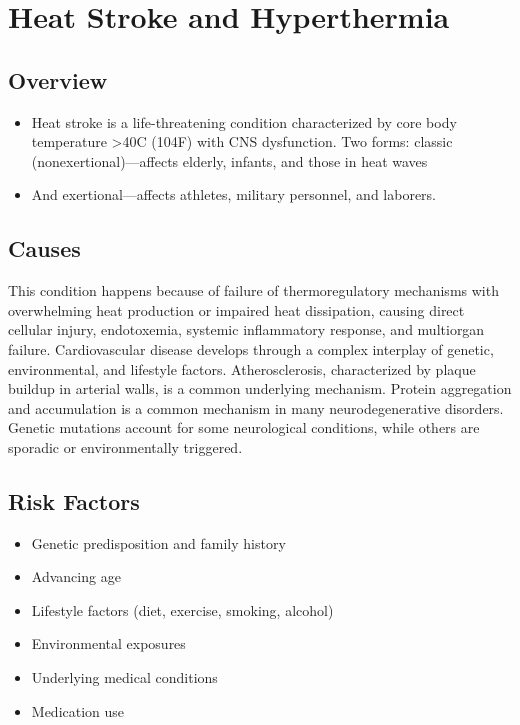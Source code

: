 \chapter{Heat Stroke and Hyperthermia}
\label{sec:Heat Stroke}

\section{Overview}


\begin{itemize}[noitemsep]
  \item Heat stroke is a life-threatening condition characterized by core body temperature >40\textdegree C (104\textdegree F) with CNS dysfunction. Two forms: classic (nonexertional)---affects elderly, infants, and those in heat waves
  \item And exertional---affects athletes, military personnel, and laborers.
\end{itemize}
\section{Causes}
This condition happens because of failure of thermoregulatory mechanisms with overwhelming heat production or impaired heat dissipation, causing direct cellular injury, endotoxemia, systemic inflammatory response, and multiorgan failure. Cardiovascular disease develops through a complex interplay of genetic, environmental, and lifestyle factors. Atherosclerosis, characterized by plaque buildup in arterial walls, is a common underlying mechanism.    Protein aggregation and accumulation is a common mechanism in many neurodegenerative disorders.  Genetic mutations account for some neurological conditions, while others are sporadic or environmentally triggered.   
\section{Risk Factors}
\begin{itemize}[noitemsep]
  \item Genetic predisposition and family history
  \item Advancing age
  \item Lifestyle factors (diet, exercise, smoking, alcohol)
  \item Environmental exposures
  \item Underlying medical conditions
  \item Medication use
\end{itemize}
